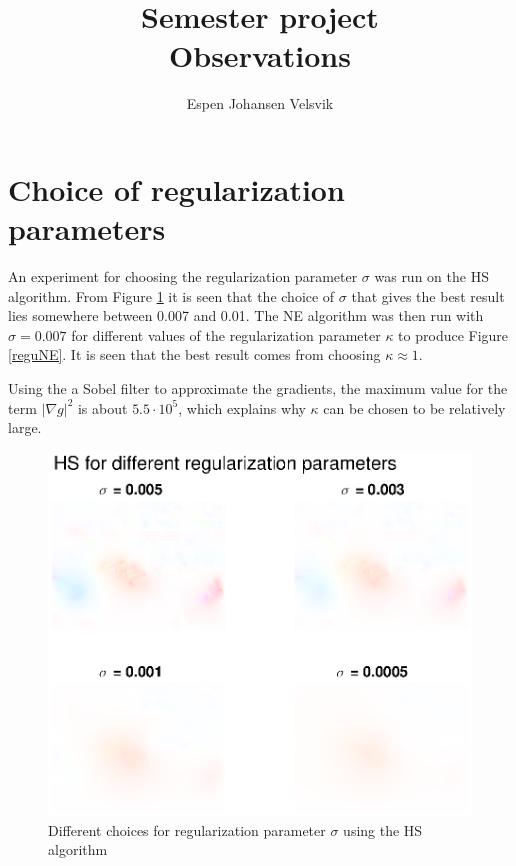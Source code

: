 \documentclass[10pt,a4paper]{article}
\begin{document}
\title{Semester project\\ Observations}
\author{Espen Johansen Velsvik}
\maketitle

\section*{Choice of regularization parameters}
An experiment for choosing the regularization parameter $\sigma$ was run on the HS algorithm. From Figure \ref{reguHS} it is seen that the choice of $\sigma$ that gives the best result lies somewhere between 0.007 and 0.01. The NE algorithm was then run with $\sigma = 0.007$ for different values of the regularization parameter $\kappa$ to produce Figure \ref{reguNE}. It is seen that the best result comes from choosing $\kappa \approx 1$.

Using the a Sobel filter to approximate the gradients, the maximum value for the term $|\nabla g|^2$ is about $5.5 \cdot 10^5$, which explains why $\kappa$ can be chosen to be relatively large.

\begin{figure}
    \centering
    \includegraphics[scale=0.8]{regularizationHS}
    \caption{Different choices for regularization parameter $\sigma$ using the HS algorithm}
    \label{reguHS}
\end{figure}
\end{document}
